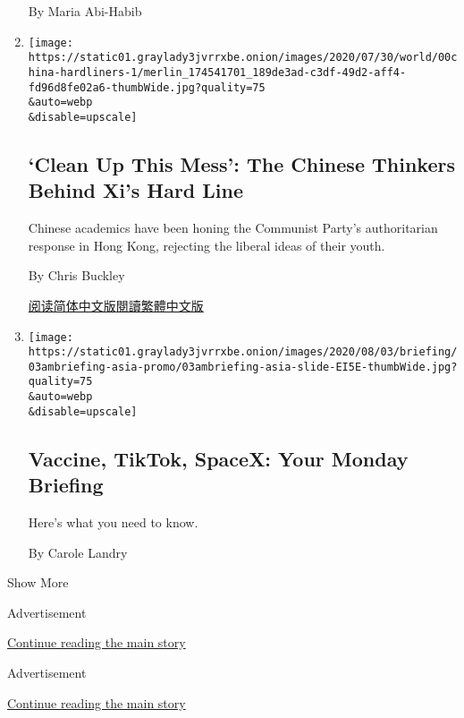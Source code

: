 \begin{enumerate}
  By Maria Abi-Habib
\item
  \href{/2020/08/02/world/asia/china-hong-kong-national-security-law.html}{}

  \texttt{[image: https://static01.graylady3jvrrxbe.onion/images/2020/07/30/world/00china-hardliners-1/merlin\_174541701\_189de3ad-c3df-49d2-aff4-fd96d8fe02a6-thumbWide.jpg?quality=75\\\&auto=webp\\\&disable=upscale]}

  \hypertarget{clean-up-this-mess-the-chinese-thinkers-behind-xis-hard-line}{%
  \subsection{`Clean Up This Mess': The Chinese Thinkers Behind Xi's
  Hard
  Line}\label{clean-up-this-mess-the-chinese-thinkers-behind-xis-hard-line}}

  Chinese academics have been honing the Communist Party's authoritarian
  response in Hong Kong, rejecting the liberal ideas of their youth.

  By Chris Buckley

  \href{https://cn.nytimes3xbfgragh.onion/china/20200803/china-hong-kong-national-security-law/}{阅读简体中文版}\href{https://cn.nytimes3xbfgragh.onion/china/20200803/china-hong-kong-national-security-law/zh-hant/}{閱讀繁體中文版}
\item
  \href{/2020/08/02/briefing/coronavirus-vaccine-india-us-tiktok-spacex.html}{}

  \texttt{[image: https://static01.graylady3jvrrxbe.onion/images/2020/08/03/briefing/03ambriefing-asia-promo/03ambriefing-asia-slide-EI5E-thumbWide.jpg?quality=75\\\&auto=webp\\\&disable=upscale]}

  \hypertarget{vaccine-tiktok-spacex-your-monday-briefing}{%
  \subsection{Vaccine, TikTok, SpaceX: Your Monday
  Briefing}\label{vaccine-tiktok-spacex-your-monday-briefing}}

  Here's what you need to know.

  By Carole Landry
\end{enumerate}

Show More

Advertisement

\protect\hyperlink{after-mid1}{Continue reading the main story}

Advertisement

\protect\hyperlink{after-mktg}{Continue reading the main story}

